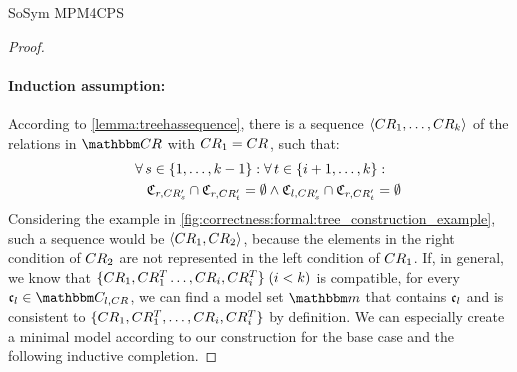 \begin{copiedFrom}{SoSym MPM4CPS}
\begin{proof}
    \paragraph{Induction assumption:} 
    According to \autoref{lemma:treehassequence}, there is a sequence $\langle CR_{1}, \dots, CR_{k} \rangle$ of the relations in $\consistencyrelationset{CR}$ with $CR_{1} = CR_{}$, such that:
    \begin{align*}
        \formulaskip &
        \forall s \in \setted{1, \dots, k-1} : \forall t \in \setted{i+1, \dots, k} : \\
        & \formulaskip
        \classtuple{C}{r,\consistencyrelation{CR'}{s}} \cap \classtuple{C}{r,\consistencyrelation{CR'}{t}} = \emptyset 
        \land
        \classtuple{C}{l,\consistencyrelation{CR'}{s}} \cap 
        \classtuple{C}{r,\consistencyrelation{CR'}{t}} = \emptyset
    \end{align*}
    Considering the example in \autoref{fig:correctness:formal:tree_construction_example}, such a sequence would be $\langle CR_{1}, CR_{2} \rangle$, because the elements in the right condition of $CR_{2}$ are not represented in the left condition of $CR_{1}$.
    If, in general, we know that $\{ CR_{1}, CR^T_{1} \dots, CR_{i}, CR^T_{i} \}\; (i < k)$ is compatible, for every $\conditionelement{c}{l} \in \condition{C}{l,\consistencyrelation{CR}{}}$, we can find a model set $\modelset{m}$ that contains $\mathfrak{c}_{l}$ and is consistent to $\{ CR_{1}, CR^T_{1}, \dots, CR_{i}, CR^T_{i} \}$ by definition.
    We can especially create a minimal model according to our construction for the base case and the following inductive completion.
    

\end{proof}
\end{copiedFrom}
